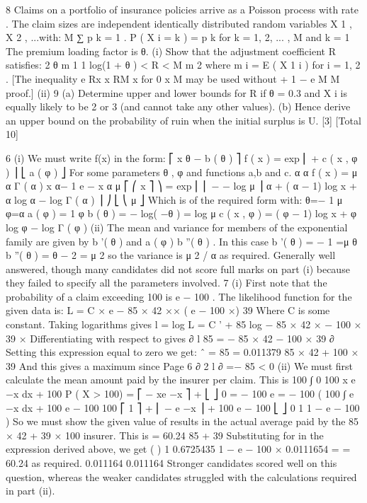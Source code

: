 \documentclass[a4paper,12pt]{article}
\begin{document}
8
Claims on a portfolio of insurance policies arrive as a Poisson process with rate \lambda  .
The claim sizes are independent identically distributed random variables
X 1 , X 2 , ...with:
M
∑ p k = 1 .
P ( X i = k ) = p k for k = 1, 2, ... , M and
k = 1
The premium loading factor is θ.
(i)
Show that the adjustment coefficient R satisfies:
2 θ m 1
1
log(1 + θ ) < R <
M
m 2
where m i = E ( X 1 i ) for i = 1, 2 .
[The inequality e Rx \leq 
[7]
x RM
x
for 0 \leq  x \leq  M may be used without
+ 1 −
e
M
M
proof.]
(ii)
9
(a) Determine upper and lower bounds for R if θ = 0.3 and X i is equally likely to be 2 or 3 (and cannot take any other values).
(b) Hence derive an upper bound on the probability of ruin when the initial
surplus is U.
[3]
[Total 10]

6
(i)
We must write f(x) in the form:
⎡ x θ − b ( θ )
⎤
f ( x ) = exp ⎢
+ c ( x , φ ) ⎥
⎣ a ( φ )
⎦
For some parameters θ , φ and functions a,b and c.
α α
f ( x ) =
μ α Γ ( α )
x
α− 1
e
−
x α
μ
⎡ ⎛ x
⎤
⎞
= exp ⎢ ⎜ − − log μ ⎟ α + ( α − 1) log x + α log α − log Γ ( α ) ⎥
⎠
⎣ ⎝ μ
⎦
Which is of the required form with:
θ=−
1
μ
φ=α
a ( φ ) =
1
φ
b ( θ ) = − log( −θ ) = log μ
c ( x , φ ) = ( φ − 1) log x + φ log φ − log Γ ( φ )
(ii)
The mean and variance for members of the exponential family are given by
b '( θ ) and a ( φ ) b ''( θ ) .
In this case b '( θ ) = −
1
=μ
θ
b ''( θ ) = θ − 2 = μ 2 so the variance is μ 2 / α as required.
Generally well answered, though many candidates did not score full marks on part (i)
because they failed to specify all the parameters involved.
7
(i)
First note that the probability of a claim exceeding 100 is e − 100 \lambda  .
The likelihood function for the given data is:
L = C ×  e − 85 × 42 ×\lambda  × ( e − 100 ×\lambda  ) 39
Where C is some constant. Taking logarithms gives
l = log L = C ' + 85 log \lambda  − 85 × 42 × \lambda  − 100 × 39 × \lambda 
Differentiating with respect to \lambda  gives
∂ l 85
=
− 85 × 42 − 100 × 39
∂\lambda  \lambda 
Setting this expression equal to zero we get:
\lambda  ˆ =
85
= 0.011379
85 × 42 + 100 × 39
And this gives a maximum since
Page 6
∂ 2 l
∂
=−
85
< 0
(ii)
We must first calculate the mean amount paid by the insurer per claim. This is
100
∫
0
100
x \lambda  e −\lambda  x dx + 100 P ( X > 100) = ⎡ − xe −\lambda  x ⎤ +
⎣
⎦ 0
= − 100 e
=
− 100 \lambda 
(
100
∫ e
−\lambda  x
dx + 100 e − 100 
100
⎡ 1
⎤
+ ⎢ − e −\lambda  x ⎥ + 100 e − 100 \lambda 
⎣ \lambda 
⎦ 0
1
1 − e − 100 \lambda 
\lambda 
)
So we must show the given value of \lambda  results in the actual average paid by the
85 × 42 + 39 × 100
insurer. This is
= 60.24
85 + 39
Substituting for \lambda  in the expression derived above, we get
(
)
1
0.6725435
1 − e − 100 × 0.0111654 =
= 60.24 as required.
0.011164
0.011164
Stronger candidates scored well on this question, whereas the weaker candidates struggled
with the calculations required in part (ii).
\end{document}
